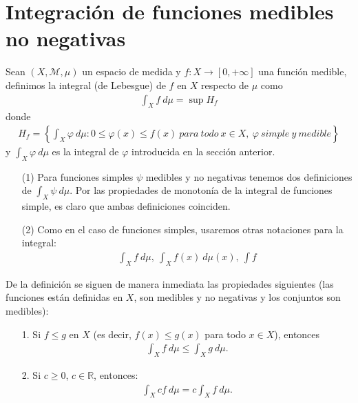 \section{Integración de funciones medibles no negativas}

\begin{defi}
Sean $(X, \mathcal{M}, \mu)$ un espacio de medida y $f: X \longrightarrow [0,+\infty]$ una función medible, definimos la integral (de Lebesgue) de $f$ en $X$ respecto de $\mu$ como
\begin{align*}
    \int_{X}{f \ d\mu} = \sup{H_f}
\end{align*}
donde
\begin{align*}
    H_f = \left\{ \int_{X}{\varphi \ d\mu} : 0 \leq \varphi(x) \leq f(x) \ para \ todo \ x \in X, \ \varphi \ simple \ y \ medible \right\}
\end{align*}
y $\int_{X}{\varphi \ d\mu}$ es la integral de $\varphi$ introducida en la sección anterior.
\end{defi}

\begin{obs}
\begin{enumerate}
    \item[(1)] Para funciones simples $\psi$ medibles y no negativas tenemos dos definiciones de $\int_{X}{\psi \ d\mu}$. Por las propiedades de monotonía de la integral de funciones simple, es claro que ambas definiciones coinciden.
    \item[(2)] Como en el caso de funciones simples, usaremos otras notaciones para la integral:
    \begin{align*}
        \int_{X}{f \ d\mu}, \ \int_{X}{f(x) \ d\mu(x)}, \ \int{f}
    \end{align*}
\end{enumerate}
\end{obs}

De la definición se siguen de manera inmediata las propiedades siguientes (las funciones están definidas en $X$, son medibles y no negativas y los conjuntos son medibles):
\begin{enumerate}
    \item[1.] Si $f \leq g$ en $X$ (es decir, $f(x) \leq g(x)$ para todo $x \in X$), entonces
    \begin{align*}
        \int_{X}{f \ d\mu} \leq \int_{X}{g \ d\mu}.
    \end{align*}
    \item[2.] Si $c \ge 0$, $c \in \mathbb{R}$, entonces:
    \begin{align*}
        \int_{X}{cf \ d\mu} = c\int_{X}{f \ d\mu}.
    \end{align*}
\end{enumerate}

